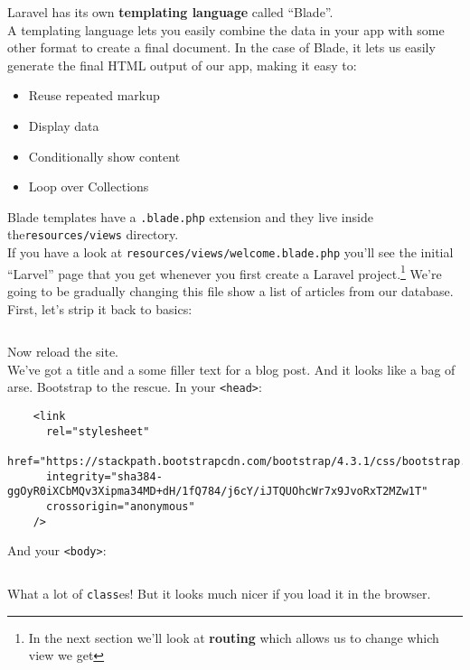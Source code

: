 Laravel has its own \textbf{templating language} called ``Blade''.
\\

A templating language lets you easily combine the data in your app with some other format to create a final document. In the case of Blade, it lets us easily generate the final HTML output of our app, making it easy to:
\\

\begin{itemize}
    \item Reuse repeated markup
    \item Display data
    \item Conditionally show content
    \item Loop over Collections
\end{itemize}

Blade templates have a \texttt{.blade.php} extension and they live inside the\texttt{resources/views} directory.
\\

If you have a look at \texttt{resources/views/welcome.blade.php} you'll see the initial ``Larvel'' page that you get whenever you first create a Laravel project.\footnote{In the next section we'll look at \textbf{routing} which allows us to change which view we get} We're going to be gradually changing this file show a list of articles from our database.
\\

First, let's strip it back to basics:

\inputminted{html}{06-blade/figures/01-basic.blade.php}

Now reload the site.
\\

We've got a title and a some filler text for a blog post. And it looks like a bag of arse. Bootstrap to the rescue. In your \texttt{<head>}:

\begin{verbatim}
    <link
      rel="stylesheet"
      href="https://stackpath.bootstrapcdn.com/bootstrap/4.3.1/css/bootstrap.min.css"
      integrity="sha384-ggOyR0iXCbMQv3Xipma34MD+dH/1fQ784/j6cY/iJTQUOhcWr7x9JvoRxT2MZw1T"
      crossorigin="anonymous"
    />
\end{verbatim}

And your \texttt{<body>}:

\inputminted{html}{06-blade/figures/02-styled.blade.php}

What a lot of \texttt{class}es! But it looks much nicer if you load it in the browser.



